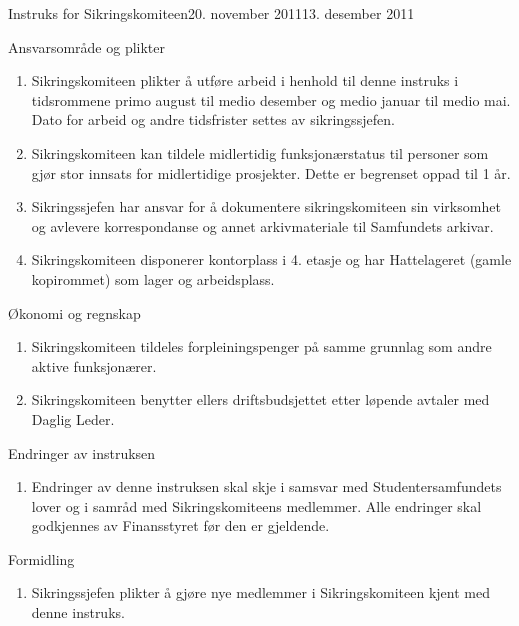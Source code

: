 \documentclass[../fsbok.tex]{subfiles}
\begin{document}
\begin{instruks}{Instruks for Sikringskomiteen}{20. november 2011}{13. desember 2011}
\begin{instruksledd}{Ansvarsområde og plikter}
\begin{enumerate}
                forbindelse med dette overholdes.
            \item Sikringskomiteen plikter å utføre arbeid i henhold til denne instruks i
                tidsrommene primo august til medio
                desember og medio januar til medio mai. Dato for arbeid og andre
                tidsfrister settes av sikringssjefen.
            \item Sikringskomiteen kan tildele midlertidig funksjonærstatus til personer
                som gjør stor innsats for midlertidige
                prosjekter. Dette er begrenset oppad til 1 år.
            \item Sikringssjefen har ansvar for å dokumentere sikringskomiteen sin
                virksomhet og avlevere korrespondanse og annet arkivmateriale til Samfundets arkivar.
	    \item Sikringskomiteen disponerer kontorplass i 4. etasje og har Hattelageret (gamle
		kopirommet) som lager og arbeidsplass.
        \end{enumerate}
    \end{instruksledd}

    \begin{instruksledd}{Økonomi og regnskap}
        \begin{enumerate}
            \item Sikringskomiteen tildeles forpleiningspenger på samme grunnlag som andre aktive
                funksjonærer.
            \item Sikringskomiteen benytter ellers driftsbudsjettet etter løpende avtaler med
                Daglig Leder.
        \end{enumerate}
    \end{instruksledd}

    \begin{instruksledd}{ Endringer av instruksen}
        \begin{enumerate}
            \item Endringer av denne instruksen skal skje i samsvar med Studentersamfundets lover
                og i samråd med
                Sikringskomiteens medlemmer. Alle endringer skal godkjennes av Finansstyret før
                den er gjeldende.
        \end{enumerate}
    \end{instruksledd}

    \begin{instruksledd}{Formidling}
        \begin{enumerate}
            \item Sikringssjefen plikter å gjøre nye medlemmer i Sikringskomiteen kjent med denne
                instruks.
        \end{enumerate}
    \end{instruksledd}

\end{instruks}
\end{document}
